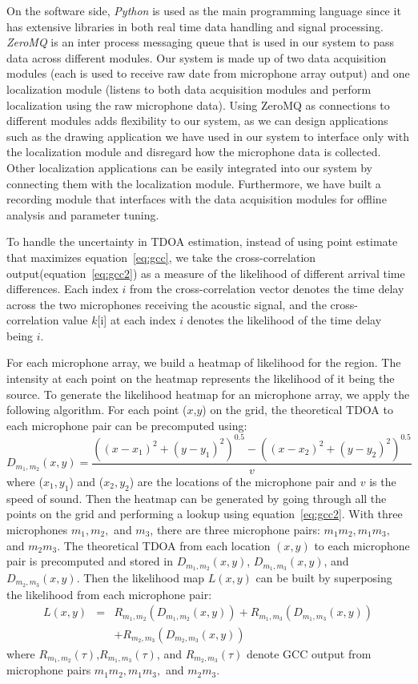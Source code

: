 On the software side, \emph{Python} is used as the main programming language since it has extensive libraries in both real time data handling and signal processing. \emph{ZeroMQ} is an inter process messaging queue that is used in our system to pass data across different modules. Our system is made up of two data acquisition modules (each is used to receive raw date from microphone array output) and one localization module (listens to both data acquisition modules and perform localization using the raw microphone data). Using ZeroMQ as connections to different modules adds flexibility to our system, as we can design applications such as the drawing application we have used in our system to interface only with the localization module and disregard how the microphone data is collected. Other localization applications can be easily integrated into our system by connecting them with the localization module. Furthermore, we have built a recording module that interfaces with the data acquisition modules for offline analysis and parameter tuning. 

To handle the uncertainty in TDOA estimation, instead of using point estimate that maximizes equation~\ref{eq:gcc}, we take the cross-correlation output(equation~\ref{eq:gcc2}) as a measure of the likelihood of different arrival time differences. Each index $i$ from the cross-correlation vector denotes the time delay across the two microphones receiving the acoustic signal, and the cross-correlation value $k$[i] at each index $i$ denotes the likelihood of the time delay being $i$. 

For each microphone array, we build a heatmap of likelihood for the region. The intensity at each point on the heatmap represents the likelihood of it being the source. To generate the likelihood heatmap for an microphone array, we apply the following algorithm. For each point ($x$,$y$) on the grid, the theoretical TDOA to each microphone pair can be precomputed using:
\[
 D_{m_1,m_2}(x,y) =  \frac{((x-x_1)^2 + (y-y_1)^2)^{0.5} - ((x-x_2)^2 + (y-y_2)^2)^{0.5}}{v}
\]
where ($x_1, y_1$) and ($x_2, y_2$) are the locations of the microphone pair and $v$ is the speed of sound. Then the heatmap can be generated by going through all the points on the grid and performing a lookup using equation~\ref{eq:gcc2}. With three microphones $m_1,m_2,$ and $m_3$, there are three microphone pairs: $m_1m_2,m_1m_3,$ and $m_2m_3$. The theoretical TDOA from each location $(x,y)$ to each microphone pair is precomputed and stored in $D_{m_1,m_2}(x,y)$, $D_{m_1,m_3}(x,y)$, and $D_{m_2,m_3}(x,y)$. Then the likelihood map $L(x,y)$ can be built by superposing the likelihood from each microphone pair:
\begin{eqnarray*}
L(x,y) &=& R_{m_1,m_2}(D_{m_1,m_2}(x,y)) + R_{m_1,m_3}(D_{m_1,m_3}(x,y)) \\
 & & +R_{m_2,m_3}(D_{m_2,m_3}(x,y)) 
\end{eqnarray*}
where $R_{m_1,m_2}(\tau)$,$R_{m_1,m_3}(\tau)$, and $R_{m_2,m_3}(\tau)$ denote GCC output from microphone pairs $m_1m_2,m_1m_3,$ and $m_2m_3$.


